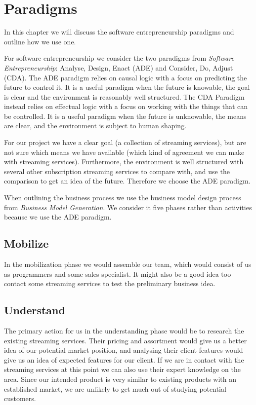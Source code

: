 \section{Paradigms}
\label{sec:paradigms}
In this chapter we will discuss the software entrepreneurship paradigms and outline how we use one.

For software entrepreneurship we consider the two paradigms from \textit{Software	Entrepreneurship}\cite[p. 27-39]{Software_entrepreneurship}: Analyse, Design, Enact (ADE) and Consider, Do, Adjust (CDA).
The ADE paradigm relies on causal logic with a focus on predicting the future to control it.
It is a useful paradigm when the future is knowable, the goal is clear and the environment is reasonably well structured.
The CDA Paradigm instead relies on effectual logic with a focus on working with the things that can be controlled.
It is a useful paradigm when the future is unknowable, the means are clear, and the environment is subject to human shaping.

For our project we have a clear goal (a collection of streaming services), but are not sure which means we have available (which kind of agreement we can make with streaming services).
Furthermore, the environment is well structured with several other subscription streaming services to compare with, and use the comparison to get an idea of the future.
Therefore we choose the ADE paradigm.

When outlining the business process we use the business model design process from \textit{Business Model Generation}\cite[p. 244-261]{canvas}. %
We consider it five phases rather than activities because we use the ADE paradigm.

\subsection{Mobilize}
In the mobilization phase we would assemble our team, which would consist of us as programmers and some sales specialist. It might also be a good idea too contact some streaming services to test the preliminary business idea.

\subsection{Understand}
The primary action for us in the understanding phase would be to research the existing streaming services. Their pricing and assortment would give us a better idea of our potential market position, and analysing their client features would give us an idea of expected features for our client.
If we are in contact with the streaming services at this point we can also use their expert knowledge on the area.
Since our intended product is very similar to existing products with an established market, we are unlikely to get much out of studying potential customers.

